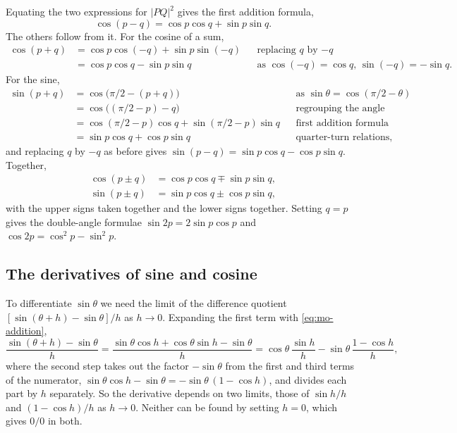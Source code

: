 Equating the two expressions for $\lvert PQ\rvert^2$ gives the first
addition formula,
\begin{equation*}
   \cos(p - q) = \cos p\cos q + \sin p\sin q .
\end{equation*}
The others follow from it. For the cosine of a sum,
\begin{align*}
   \cos(p+q) &= \cos p\cos(-q) + \sin p\sin(-q)
      && \text{replacing $q$ by $-q$}\\
   &= \cos p\cos q - \sin p\sin q
      && \text{as $\cos(-q) = \cos q$, $\sin(-q) = -\sin q$.}
\end{align*}
For the sine,
\begin{align*}
   \sin(p+q) &= \cos\bigl(\pi/2 - (p+q)\bigr)
      && \text{as $\sin\theta = \cos(\pi/2 - \theta)$}\\
   &= \cos\bigl((\pi/2 - p) - q\bigr)
      && \text{regrouping the angle}\\
   &= \cos(\pi/2 - p)\cos q + \sin(\pi/2 - p)\sin q
      && \text{first addition formula}\\
   &= \sin p\cos q + \cos p\sin q
      && \text{quarter-turn relations,}
\end{align*}
and replacing $q$ by $-q$ as before gives $\sin(p-q) = \sin p\cos q -
\cos p\sin q$. Together,
\begin{equation}
\begin{aligned}
   \cos(p \pm q) &= \cos p\cos q \mp \sin p\sin q ,\\
   \sin(p \pm q) &= \sin p\cos q \pm \cos p\sin q ,
\end{aligned}
\label{eq:mo-addition}
\end{equation}
with the upper signs taken together and the lower signs together. Setting
$q = p$ gives the double-angle formulae $\sin 2p = 2\sin p\cos p$ and
$\cos 2p = \cos^2 p - \sin^2 p$.

\subsection*{The derivatives of sine and cosine}

To differentiate $\sin\theta$ we need the limit of the difference quotient
$[\sin(\theta + h) - \sin\theta]/h$ as $h \to 0$. Expanding the first term
with \cref{eq:mo-addition},
\begin{equation*}
   \frac{\sin(\theta+h) - \sin\theta}{h}
   = \frac{\sin\theta\cos h + \cos\theta\sin h - \sin\theta}{h}
   = \cos\theta\,\frac{\sin h}{h} - \sin\theta\,\frac{1 - \cos h}{h} ,
\end{equation*}
where the second step takes out the factor $-\sin\theta$ from the first
and third terms of the numerator, $\sin\theta\cos h - \sin\theta =
-\sin\theta\,(1 - \cos h)$, and divides each part by $h$ separately. So
the derivative depends on two limits, those of $\sin h/h$ and $(1 -
\cos h)/h$ as $h \to 0$. Neither can be found by setting $h = 0$, which
gives $0/0$ in both.

